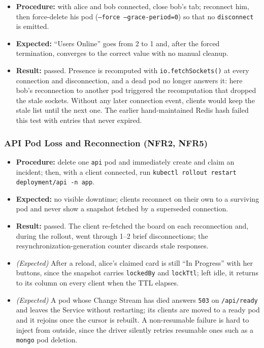 \documentclass{scrartcl}
\begin{document}
\begin{itemize}
  \item \textbf{Procedure:} with alice and bob connected, close bob's tab; reconnect him, then force-delete his pod (\texttt{--force --grace-period=0}) so that no \texttt{disconnect} is emitted.
  \item \textbf{Expected:} ``Users Online'' goes from 2 to 1 and, after the forced termination, converges to the correct value with no manual cleanup.
  \item \textbf{Result:} passed. Presence is recomputed with \texttt{io.fetchSockets()} at every connection and disconnection, and a dead pod no longer answers it: here bob's reconnection to another pod triggered the recomputation that dropped the stale sockets. Without any later connection event, clients would keep the stale list until the next one. The earlier hand-maintained Redis hash failed this test with entries that never expired.
\end{itemize}

\subsubsection{API Pod Loss and Reconnection (NFR2, NFR5)}

\begin{itemize}
  \item \textbf{Procedure:} delete one \texttt{api} pod and immediately create and claim an incident; then, with a client connected, run \texttt{kubectl rollout restart deployment/api -n app}.
  \item \textbf{Expected:} no visible downtime; clients reconnect on their own to a surviving pod and never show a snapshot fetched by a superseded connection.
  \item \textbf{Result:} passed. The client re-fetched the board on each reconnection and, during the rollout, went through 1--2 brief disconnections; the resynchronization-generation counter discards stale responses.
  \item \emph{(Expected)} After a reload, alice's claimed card is still ``In Progress'' with her buttons, since the snapshot carries \texttt{lockedBy} and \texttt{lockTtl}; left idle, it returns to its column on every client when the TTL elapses.
  \item \emph{(Expected)} A pod whose Change Stream has died answers \texttt{503} on \texttt{/api/ready} and leaves the Service without restarting; its clients are moved to a ready pod and it rejoins once the cursor is rebuilt. A non-resumable failure is hard to inject from outside, since the driver silently retries resumable ones such as a \texttt{mongo} pod deletion.
\end{itemize}
\end{document}
